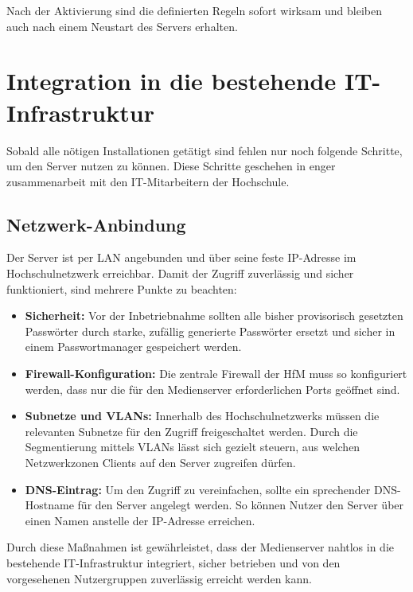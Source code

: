 \documentclass[12pt,a4paper]{report}
\begin{document}
  Nach der Aktivierung sind die definierten Regeln sofort wirksam und bleiben auch nach einem Neustart des Servers erhalten.


\section{Integration in die bestehende IT-Infrastruktur}
Sobald alle nötigen Installationen getätigt sind fehlen nur noch folgende Schritte, um den Server nutzen zu können.
Diese Schritte geschehen in enger zusammenarbeit mit den IT-Mitarbeitern der Hochschule.

  \subsection{Netzwerk-Anbindung} 
  Der Server ist per \ac{LAN} angebunden und über seine feste \ac{IP}-Adresse im Hochschulnetzwerk erreichbar. 
  Damit der Zugriff zuverlässig und sicher funktioniert, sind mehrere Punkte zu beachten:

  \begin{itemize}
    \item \textbf{Sicherheit:} Vor der Inbetriebnahme sollten alle bisher provisorisch gesetzten Passwörter durch starke, 
    zufällig generierte Passwörter ersetzt und sicher in einem Passwortmanager gespeichert werden.
    \item \textbf{Firewall-Konfiguration:} Die zentrale Firewall der HfM muss so konfiguriert werden, 
    dass nur die für den Medienserver erforderlichen Ports geöffnet sind.
    \item \textbf{Subnetze und \ac{VLAN}s:} Innerhalb des Hochschulnetzwerks müssen die relevanten Subnetze für den Zugriff freigeschaltet werden. 
          Durch die Segmentierung mittels VLANs lässt sich gezielt steuern, aus welchen Netzwerkzonen Clients auf den Server zugreifen dürfen.
    \item \textbf{\ac{DNS}-Eintrag:} Um den Zugriff zu vereinfachen, sollte ein sprechender DNS-Hostname für den Server angelegt werden. 
          So können Nutzer den Server über einen Namen anstelle der IP-Adresse erreichen.
  \end{itemize}

  Durch diese Maßnahmen ist gewährleistet, dass der Medienserver nahtlos in die bestehende IT-Infrastruktur integriert, 
  sicher betrieben und von den vorgesehenen Nutzergruppen zuverlässig erreicht werden kann.
\end{document}
